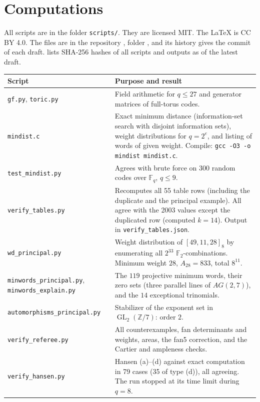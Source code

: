 \documentclass[12pt,letterpaper]{article}
\newcommand{\F}{\mathbb{F}}
\newcommand{\Z}{\mathbb{Z}}
\DeclareMathOperator{\GL}{GL}
\begin{document}
\section{Computations}\label{sec:computations}

All scripts are in the folder \texttt{scripts/}. They are licensed MIT. The
LaTeX is CC BY 4.0. The files are in the repository
, folder , and its
history gives the commit of each draft.  lists
SHA-256 hashes of all scripts and outputs as of the latest draft.

\begin{longtable}{@{}L{0.34\textwidth}L{0.58\textwidth}@{}}
\toprule
Script & Purpose and result\\ \midrule
\endhead
\texttt{gf.py}, \texttt{toric.py} & Field arithmetic for $q\le27$ and
generator matrices of full-torus codes.\\
\texttt{mindist.c} & Exact minimum distance (information-set search with
disjoint information sets), weight distributions for $q=2^e$, and listing of
words of given weight. Compile: \texttt{gcc -O3 -o mindist mindist.c}.\\
\texttt{test\_mindist.py} & Agrees with brute force on 300 random codes over
$\F_q$, $q\le9$.\\
\texttt{verify\_tables.py} & Recomputes all 55 table rows (including the duplicate and the principal example). All agree with the
2003 values except the duplicated row (computed $k=14$). Output in
\texttt{verify\_tables.json}.\\
\texttt{wd\_principal.py} & Weight distribution of $[49,11,28]_8$ by
enumerating all $2^{33}$ $\F_2$-combinations. Minimum weight $28$,
$A_{28}=833$, total $8^{11}$.\\
\texttt{minwords\_principal.py}, \texttt{minwords\_explain.py} & The $119$
projective minimum words, their zero sets (three parallel lines of $AG(2,7)$),
and the $14$ exceptional trinomials.\\
\texttt{automorphisms\_\allowbreak principal.py} & Stabilizer of the exponent set in
$\GL_2(\Z/7)$: order $2$.\\
\texttt{verify\_referee.py} & All counterexamples, fan determinants and
weights, areas, the fan5 correction, and the Cartier and ampleness checks.\\
\texttt{verify\_hansen.py} & Hansen (a)--(d) against exact computation in 79
cases (35 of type (d)), all agreeing. The run stopped at its time limit
during $q=8$.\\

\end{longtable}
\end{document}
